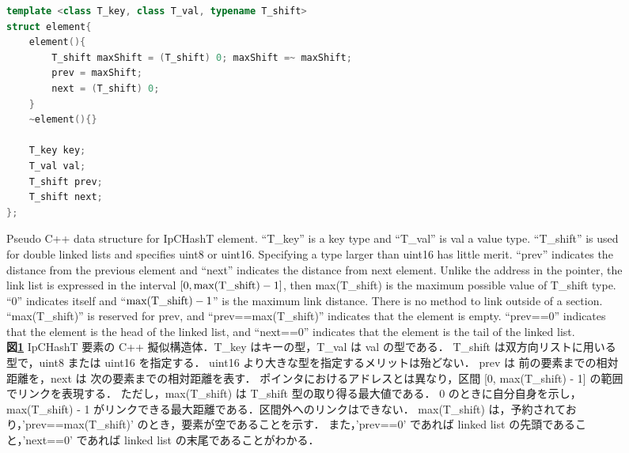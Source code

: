 \begin{figure} %
\begin{lstlisting}[language=C++]
template <class T_key, class T_val, typename T_shift>
struct element{
	element(){
		T_shift maxShift = (T_shift) 0; maxShift =~ maxShift;
		prev = maxShift;
		next = (T_shift) 0;
	}
	~element(){}
	
	T_key key;
	T_val val;
	T_shift prev;
	T_shift next;
};
\end{lstlisting}
\caption{
  Pseudo C++ data structure for IpCHashT element. ``T\_key'' is a key type and ``T\_val'' is val a value type.
  ``T\_shift'' is used for double linked lists and specifies uint8 or uint16.
  Specifying a type larger than uint16 has little merit.
  ``prev'' indicates the distance from the previous element and 
  ``next'' indicates the distance from next element.
  Unlike the address in the pointer, the link list is expressed in the interval $[0, {\rm max(T\_shift)}-1]$,
  then max(T\_shift) is the maximum possible value of T\_shift type.
  ``$0$'' indicates itself and ``${\rm max(T\_shift)}-1$'' is the maximum link distance.
  There is no method to link outside of a section.
  ``max(T\_shift)'' is reserved for prev, and ``prev==max(T\_shift)'' indicates that the element is empty.
  ``prev==0'' indicates that the element is the head of the linked list,
  and ``next==0'' indicates that the element is the tail of the linked list.
  \\
  {\bf 図\ref{fig_IpCHashT_struct}}
  IpCHashT 要素の C++ 擬似構造体．T\_key はキーの型，T\_val は val の型である．
  T\_shift は双方向リストに用いる型で，uint8 または uint16 を指定する．
  uint16 より大きな型を指定するメリットは殆どない．
  prev は 前の要素までの相対距離を，next は 次の要素までの相対距離を表す．
  ポインタにおけるアドレスとは異なり，区間 [0, max(T\_shift) - 1] の範囲でリンクを表現する．
  ただし，max(T\_shift) は T\_shift 型の取り得る最大値である．
  0 のときに自分自身を示し，max(T\_shift) - 1 がリンクできる最大距離である．区間外へのリンクはできない．
  max(T\_shift) は，予約されており，'prev==max(T\_shift)' のとき，要素が空であることを示す．
  また，'prev==0' であれば linked list の先頭であること，'next==0' であれば linked list の末尾であることがわかる．
}
\label{fig_IpCHashT_struct}
\end{figure}

